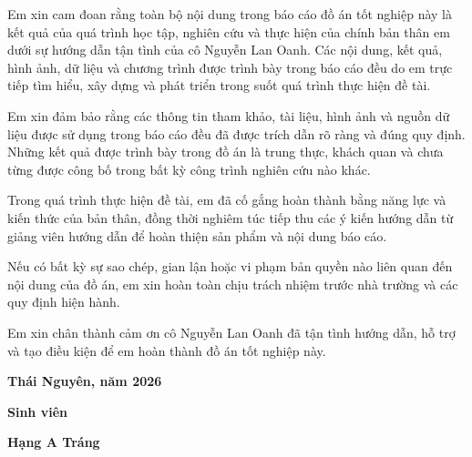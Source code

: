 


Em xin cam đoan rằng toàn bộ nội dung trong báo cáo đồ án tốt nghiệp này là kết quả của quá trình học tập, nghiên cứu và thực hiện của chính bản thân em dưới sự hướng dẫn tận tình của cô Nguyễn Lan Oanh. Các nội dung, kết quả, hình ảnh, dữ liệu và chương trình được trình bày trong báo cáo đều do em trực tiếp tìm hiểu, xây dựng và phát triển trong suốt quá trình thực hiện đề tài.


Em xin đảm bảo rằng các thông tin tham khảo, tài liệu, hình ảnh và nguồn dữ liệu được sử dụng trong báo cáo đều đã được trích dẫn rõ ràng và đúng quy định. Những kết quả được trình bày trong đồ án là trung thực, khách quan và chưa từng được công bố trong bất kỳ công trình nghiên cứu nào khác.


Trong quá trình thực hiện đề tài, em đã cố gắng hoàn thành bằng năng lực và kiến thức của bản thân, đồng thời nghiêm túc tiếp thu các ý kiến hướng dẫn từ giảng viên hướng dẫn để hoàn thiện sản phẩm và nội dung báo cáo.


Nếu có bất kỳ sự sao chép, gian lận hoặc vi phạm bản quyền nào liên quan đến nội dung của đồ án, em xin hoàn toàn chịu trách nhiệm trước nhà trường và các quy định hiện hành.


Em xin chân thành cảm ơn cô Nguyễn Lan Oanh đã tận tình hướng dẫn, hỗ trợ và tạo điều kiện để em hoàn thành đồ án tốt nghiệp này.

\vspace{1.2cm}

\hfill
\begin{minipage}{7cm}
	\centering
	
	\textbf{Thái Nguyên, năm 2026}
	
	\vspace{0.7cm}
	
	\textbf{Sinh viên}
	
	\vspace{2.8cm}
	
	\textbf{Hạng A Tráng}
	
\end{minipage}